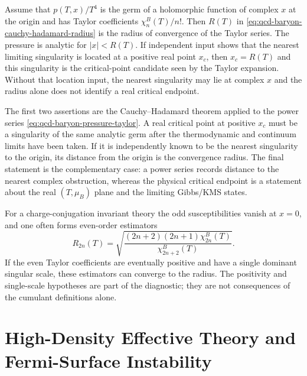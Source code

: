 \begin{remark}
\label{rem:qcd-baryon-radius-diagnostic-status}
Assume that \(p(T,x)/T^4\) is the germ of a holomorphic function of complex
\(x\) at the origin and has Taylor coefficients
\(\chi_n^B(T)/n!\).  Then \(R(T)\) in
\eqref{eq:qcd-baryon-cauchy-hadamard-radius} is the radius of convergence of
the Taylor series.  The pressure is analytic for \(|x|<R(T)\).  If
independent input shows that the nearest limiting singularity is located at
a positive real point \(x_c\), then \(x_c=R(T)\) and this singularity is the
critical-point candidate seen by the Taylor expansion.  Without that
location input, the nearest singularity may lie at complex \(x\) and the
radius alone does not identify a real critical endpoint.

The first two assertions are the Cauchy--Hadamard theorem applied to the
power series \eqref{eq:qcd-baryon-pressure-taylor}.  A real critical point at
positive \(x_c\) must be a singularity of the same analytic germ after the
thermodynamic and continuum limits have been taken.  If it is independently
known to be the nearest singularity to the origin, its distance from the
origin is the convergence radius.  The final statement is the complementary
case: a power series records distance to the nearest complex obstruction,
whereas the physical critical endpoint is a statement about the real
\((T,\mu_B)\) plane and the limiting Gibbs/KMS states.
\end{remark}

\begin{remark}
\label{rem:qcd-baryon-ratio-estimators}
For a charge-conjugation invariant theory the odd susceptibilities vanish at
\(x=0\), and one often forms even-order estimators
\begin{equation}
  R_{2n}(T)
  =
  \sqrt{
    \frac{(2n+2)(2n+1)\chi_{2n}^B(T)}
         {\chi_{2n+2}^B(T)}
  }.
  \label{eq:qcd-baryon-ratio-estimator}
\end{equation}
If the even Taylor coefficients are eventually positive and have a single
dominant singular scale, these estimators can converge to the radius.  The
positivity and single-scale hypotheses are part of the diagnostic; they are
not consequences of the cumulant definitions alone.
\end{remark}

\section{High-Density Effective Theory and Fermi-Surface Instability}
\label{sec:qcd-high-density-effective-theory}

